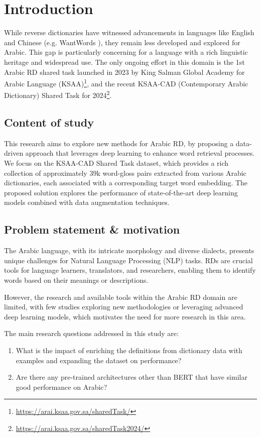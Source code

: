 \documentclass[12pt]{article}
\begin{document}
\newpage

\section{Introduction}

While reverse dictionaries have witnessed advancements in languages like English and Chinese (e.g. WantWords \cite{Qi2020}), they remain less developed and explored for Arabic. This gap is particularly concerning for a language with a rich linguistic heritage and widespread use. The only ongoing effort in this domain is the 1st Arabic RD shared task launched in 2023 by King Salman Global Academy for Arabic Language (KSAA)\footnote{\url{https://arai.ksaa.gov.sa/sharedTask/}}, and the recent KSAA-CAD (Contemporary Arabic Dictionary) Shared Task for 2024\footnote{\url{https://arai.ksaa.gov.sa/sharedTask2024/}}.

\subsection{Content of study}

This research aims to explore new methods for Arabic RD, by proposing a data-driven approach that leverages deep learning to enhance word retrieval processes. We focus on the KSAA-CAD Shared Task dataset, which provides a rich collection of approximately 39k word-gloss pairs extracted from various Arabic dictionaries, each associated with a corresponding target word embedding. The proposed solution explores the performance of state-of-the-art deep learning models combined with data augmentation techniques.

\subsection{Problem statement \& motivation}

The Arabic language, with its intricate morphology and diverse dialects, presents unique challenges for Natural Language Processing (NLP) tasks. RDs are crucial tools for language learners, translators, and researchers, enabling them to identify words based on their meanings or descriptions.

However, the research and available tools within the Arabic RD domain are limited, with few studies exploring new methodologies or leveraging advanced deep learning models, which motivates the need for more research in this area.

The main research questions addressed in this study are:
\begin{enumerate}
    \item What is the impact of enriching the definitions from dictionary data with examples and expanding the dataset on performance?
    \item Are there any pre-trained architectures other than BERT that have similar good performance on Arabic?
\end{enumerate}
\end{document}
